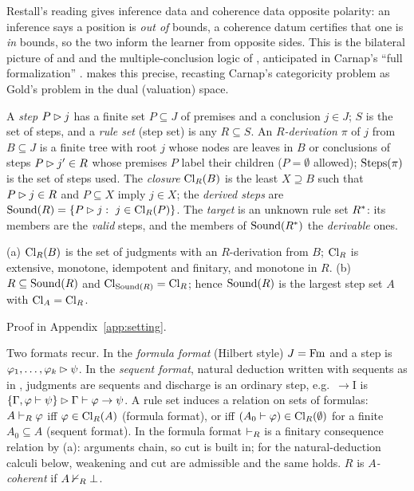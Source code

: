 Restall's reading gives inference data and coherence data opposite polarity: an
inference says a position is \emph{out of} bounds, a coherence datum certifies
that one is \emph{in} bounds, so the two inform the learner from opposite sides.
This is the bilateral picture of \citet{smiley1996rejection} and
\citet{rumfitt2000yes} and the multiple-conclusion logic of
\citet{shoesmith1978multiple}, anticipated in Carnap's ``full formalization''
\citep{carnap1943formalization}.  makes this precise,
recasting Carnap's categoricity problem as Gold's problem in the dual
(valuation) space.

\begin{definition}\label{def:setting:step}
A \emph{step} $P\rhd j$ has a finite set $P\subseteq J$ of premises and a
conclusion $j\in J$; $S$ is the set of steps, and a \emph{rule set} (step set) is
any $R\subseteq S$. An \emph{$R$-derivation} $\pi$ of $j$ from $B\subseteq J$ is a
finite tree with root $j$ whose nodes are leaves in $B$ or conclusions of steps
$P\rhd j'\in R$ whose premises $P$ label their children ($P=\emptyset$ allowed);
$\mathrm{Steps}(\pi)$ is the set of steps used. The \emph{closure} $\mathrm{Cl}_R(B)$ is the least
$X\supseteq B$ such that $P\rhd j\in R$ and $P\subseteq X$ imply $j\in X$; the
\emph{derived steps} are $\mathrm{Sound}(R)=\{P\rhd j:\ j\in\mathrm{Cl}_R(P)\}$. The
\emph{target} is an unknown rule set $R^{*}$: its members are the \emph{valid}
steps, and the members of $\mathrm{Sound}(R^{*})$ the \emph{derivable} ones.
\end{definition}

\begin{lemma}\label{lem:setting:closure}
\textup{(a)} $\mathrm{Cl}_R(B)$ is the set of judgments with an $R$-derivation from $B$;
$\mathrm{Cl}_R$ is extensive, monotone, idempotent and finitary, and monotone in $R$.
\textup{(b)} $R\subseteq\mathrm{Sound}(R)$ and $\mathrm{Cl}_{\mathrm{Sound}(R)}=\mathrm{Cl}_R$; hence $\mathrm{Sound}(R)$
is the largest step set $A$ with $\mathrm{Cl}_A=\mathrm{Cl}_R$.
\hfill{}\ 
\end{lemma}
Proof in Appendix~\ref{app:setting}.

Two formats recur. In the \emph{formula format} (Hilbert style) $J=\mathrm{Fm}$ and a step
is $\varphi_1,\dots,\varphi_k\rhd\psi$. In the \emph{sequent format}, natural
deduction \citep{gentzen1935untersuchungen,prawitz1965natural} written with
sequents as in \citet{gentzen1936widerspruchsfreiheit}, judgments are sequents and
discharge is an ordinary step, e.g.\ $\to$I is
$\{\Gamma,\varphi\vdash\psi\}\rhd\Gamma\vdash\varphi\to\psi$. A rule set induces a
relation on sets of formulas: $A\vdash_R\varphi$ iff $\varphi\in\mathrm{Cl}_R(A)$ (formula
format), or iff $(A_0\vdash\varphi)\in\mathrm{Cl}_R(\emptyset)$ for a finite
$A_0\subseteq A$ (sequent format). In the formula format $\vdash_R$ is a finitary
consequence relation by (a): arguments chain, so cut is
built in; for the natural-deduction calculi below, weakening and cut are
admissible and the same holds. $R$ is \emph{$A$-coherent} if $A\nvdash_R\bot$.

